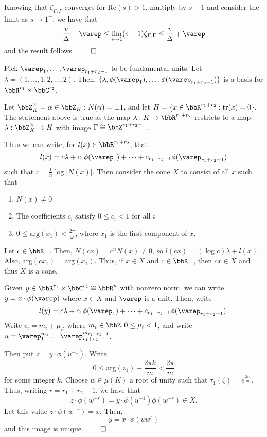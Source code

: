 \documentclass[a4paper, 12pt,oneside,openany]{book}
\begin{document}
Knowing that $\zeta_{F, \Gamma}$ converges for $\text{Re}(s)>1$, multiply by $s-1$ and consider the limit as $s\to1^+$: we have that $$\frac{v}{\Delta}-\varep \leq \lim\limits_{s\to1}(s-1)\zeta_{F, \Gamma}\leq \frac{v}{\Delta}+\varep$$ and the result follows. $\qed$

Pick $\varep_1, \dots, \varep_{r_1+r_2-1}$ to be fundamental units. Let $\lambda=(1, \dots, 1; 2, \dots, 2)$. Then, $\{\lambda, \phi(\varep_1), \dots, \phi(\varep_{r_1+r_2-1})\}$ is a basis for $\bbR^{r_1} \times \bbC^{r_2}$. 

Let $\bbZ_K^\times = \alpha \in \bbZ_K: N(\alpha)=\pm 1$, and let $H=\{x \in \bbR^{r_1+r_2}: \text{tr}(x)=0\}.$ The statement above is true as the map $\lambda:K\to \bbR^{r_1+r_2}$ restricts to a map $\lambda: \bbZ_K^\times \to H$ with image $\Gamma \cong \bbZ^{r_1+r_2-1}$.

Thus we can write, for $l(x)\in \bbR^{r_1+r_2}$, that $$l(x)=c\lambda+c_1 \phi(\varep_1)+\dots+c_{r_1+r_2-1} \phi(\varep_{r_1+r_2-1})$$ such that $c = \frac{1}{n} \log |N(x)|$. Then consider the cone $X$ to consist of all $x$ such that \begin{enumerate}
	\item $N(x) \neq 0$
	\item The coefficients $c_i$ satisfy $0 \leq c_i<1$ for all $i$
	\item $0\leq \text{arg}(x_1) < \frac{2\pi}{\omega}$, where $x_1$ is the first component of $x$.
\end{enumerate}

Let $c \in \bbR^+$. Then, $N(cx)=c^n N(x) \neq 0$, so $l(cx)=(\log c)\lambda + l(x)$. Also, $\text{arg}(cx_1)=\text{arg}(x_1)$. Thus, if $x\in X$ and $c \in \bbR^+$, then $cx \in X$ and thus $X$ is a cone. 


 Given $y\in \bbR^{r_1}\times \bbC^{r_2} \cong \bbR^n$ with nonzero norm, we can write $y= x\cdot \phi(\varep)$ where $x\in X$ and $\varep$ is a unit. Then, write $$l(y)=c\lambda+c_1 \phi(\varep_1)+\dots+c_{r_1+r_2-1} \phi(\varep_{r_1+r_2-1}).$$ Write $c_i=m_i+\mu_i$, where $m_i \in \bbZ, 0\leq \mu_i<1$, and write $u=\varep_1^{m_1}\dots \varep_{r_1+r_2-1}^{m_{r_1+r_2-1}}$. 

Then put $z =y \cdot \phi(u^{-1})$. Write $$0\leq \text{arg}(z_1)-\frac{2\pi k}{m} < \frac{2\pi}{m}$$ for some integer $k$. Choose $w \in \mu(K)$ a root of unity such that $\tau_1(\zeta)=e^{\frac{2\pi i}{m}}$. Thus, writing $r=r_1+r_2-1$, we have that $$z \cdot \phi(w^{-r})=y \cdot \phi(u^{-1})\phi(w^{-r}) \in X.$$ Let this value $z \cdot \phi(w^{-r})=x$. Then, $$y=x \cdot \phi(uw^r)$$ and  this image is unique. $\qed$
\end{document}
